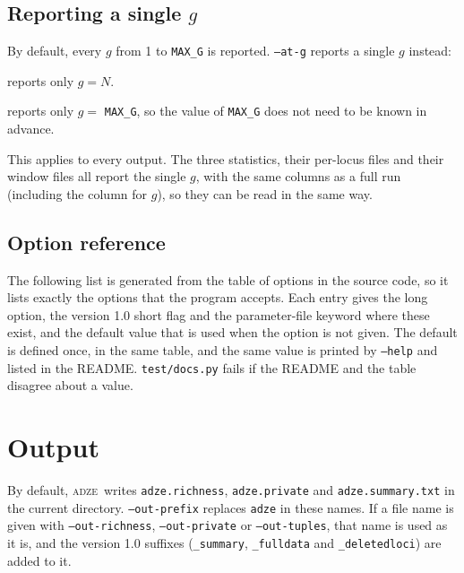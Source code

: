 \documentclass[11pt]{article}
\newcommand{\prog}{\textsc{adze}}
\newcommand{\flag}[1]{\texttt{#1}}
\begin{document}
\subsection{Reporting a single \texorpdfstring{$g$}{g}}
\label{sec:atg}

By default, every $g$ from 1 to \texttt{MAX\_G} is reported. \flag{--at-g}
reports a single $g$ instead:

\begin{description}[leftmargin=2em,style=nextline]
\item[\flag{--at-g} \textit{N}] reports only $g = N$.
\item[\flag{--at-g max}] reports only $g = $ \texttt{MAX\_G}, so the value of
  \texttt{MAX\_G} does not need to be known in advance.
\end{description}

\noindent This applies to every output. The three statistics, their
per-locus files and their window files all report the single $g$, with the
same columns as a full run (including the column for $g$), so they can be read
in the same way.

\subsection{Option reference}
\label{sec:options}

The following list is generated from the table of options in the source
code, so it lists exactly the options that the program accepts. Each entry
gives the long option, the version 1.0 short flag and the parameter-file
keyword where these exist, and the default value that is used when the option
is not given. The default is defined once, in the same table, and the same
value is printed by \flag{--help} and listed in the README.
\texttt{test/docs.py} fails if the README and the table disagree about a
value.



\section{Output}
\label{sec:output}

By default, \prog\ writes \texttt{adze.richness}, \texttt{adze.private} and
\texttt{adze.summary.txt} in the current directory. \flag{--out-prefix}
replaces \texttt{adze} in these names. If a file name is given with
\flag{--out-richness}, \flag{--out-private} or \flag{--out-tuples}, that name
is used as it is, and the version 1.0 suffixes (\texttt{\_summary},
\texttt{\_fulldata} and \texttt{\_deletedloci}) are added to it.
\end{document}
